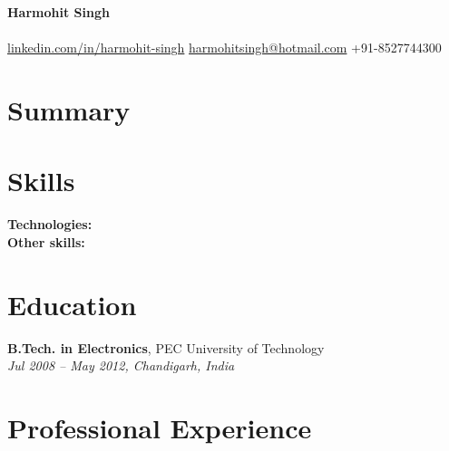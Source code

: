 \documentclass[a4paper,10pt]{article}
\begin{document}
\begin{center}
    \textbf{\LARGE Harmohit Singh} \\
    \vspace{0.2em}
    \textbf{} \\
    \href{https://linkedin.com/in/harmohit-singh}{linkedin.com/in/harmohit-singh} \quad \href{mailto:harmohitsingh@hotmail.com}{harmohitsingh@hotmail.com} \quad +91-8527744300
\end{center}

\section*{Summary}


\section*{Skills}
\textbf{Technologies:}  \\
\textbf{Other skills:} 

\section*{Education}
\textbf{B.Tech. in Electronics}, PEC University of Technology \\
\textit{Jul 2008 – May 2012, Chandigarh, India}

\section*{Professional Experience}
\end{document}
